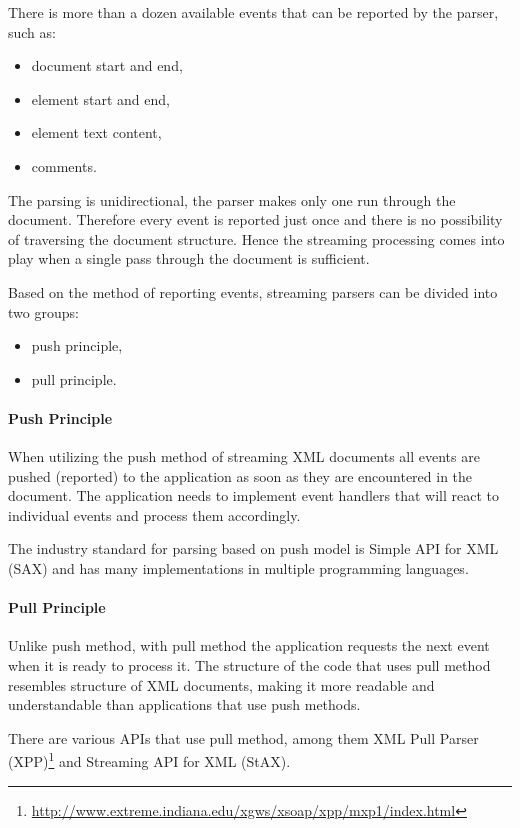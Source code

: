 \documentclass[11pt,oneside,final]{fithesis2}
\begin{document}
There is more than a dozen available events that can be reported by the parser, such as:
\begin{itemize}
\item document start and end,
\item element start and end,
\item element text content,
\item comments.  
\end{itemize}

The parsing is unidirectional, the parser makes only one run through the document. Therefore every event is reported just once and there is no possibility of traversing the document structure. Hence the streaming processing comes into play when a single pass through the document is sufficient.

Based on the method of reporting events, streaming parsers can be divided into two groups:
\begin{itemize}
\item push principle,
\item pull principle.
\end{itemize}

\paragraph*{Push Principle} When utilizing the push method of streaming XML documents all events are pushed (reported) to the application as soon as they are encountered in the document. The application needs to implement event handlers that will react to individual events and process them accordingly.

The industry standard for parsing based on push model is Simple API for XML (SAX) and has many implementations in multiple programming languages.

\paragraph*{Pull Principle} Unlike push method, with pull method the application requests the next event when it is ready to process it. The structure of the code that uses pull method resembles structure of XML documents, making it more readable and understandable than applications that use push methods.

There are various APIs that use pull method, among them XML Pull Parser (XPP)\footnote{\url{http://www.extreme.indiana.edu/xgws/xsoap/xpp/mxp1/index.html}}  and Streaming API for XML (StAX).
\end{document}
